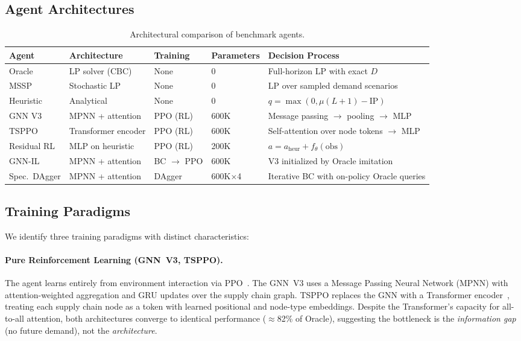 \subsection{Agent Architectures}

\begin{table}[h!]
\caption{Architectural comparison of benchmark agents.}
\label{tab:architecture}
\centering
\small
\begin{tabular}{lllll}
\toprule
\textbf{Agent} & \textbf{Architecture} & \textbf{Training} & \textbf{Parameters} & \textbf{Decision Process} \\
\midrule
Oracle & LP solver (CBC) & None & 0 & Full-horizon LP with exact $D$ \\
MSSP & Stochastic LP & None & 0 & LP over sampled demand scenarios \\
Heuristic & Analytical & None & 0 & $q = \max(0, \mu(L{+}1) - \text{IP})$ \\
\midrule
GNN V3 & MPNN + attention & PPO (RL) & 600K & Message passing $\to$ pooling $\to$ MLP \\
TSPPO & Transformer encoder & PPO (RL) & 600K & Self-attention over node tokens $\to$ MLP \\
Residual RL & MLP on heuristic & PPO (RL) & 200K & $a = a_{\text{heur}} + f_\theta(\text{obs})$ \\
\midrule
GNN-IL & MPNN + attention & BC $\to$ PPO & 600K & V3 initialized by Oracle imitation \\
Spec.\ DAgger & MPNN + attention & DAgger & 600K$\times$4 & Iterative BC with on-policy Oracle queries \\
\bottomrule
\end{tabular}
\end{table}

\subsection{Training Paradigms}

We identify three training paradigms with distinct characteristics:

\paragraph{Pure Reinforcement Learning (GNN~V3, TSPPO).}
The agent learns entirely from environment interaction via PPO~\cite{schulman2017ppo}. The GNN~V3 uses a Message Passing Neural Network (MPNN) with attention-weighted aggregation and GRU updates over the supply chain graph. TSPPO replaces the GNN with a Transformer encoder~\cite{vaswani2017attention}, treating each supply chain node as a token with learned positional and node-type embeddings. Despite the Transformer's capacity for all-to-all attention, both architectures converge to identical performance ($\approx$82\% of Oracle), suggesting the bottleneck is the \emph{information gap} (no future demand), not the \emph{architecture}.

